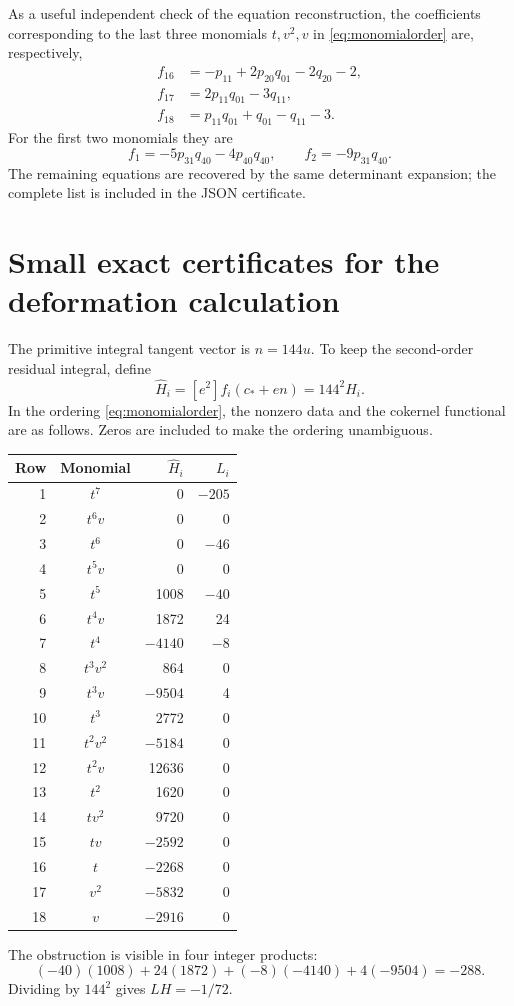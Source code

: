 \documentclass[11pt,a4paper]{article}
\numberwithin{equation}{section}
\theoremstyle{definition}
\theoremstyle{remark}
\newcommand{\cstar}{c_*}
\begin{document}
As a useful independent check of the equation reconstruction, the
coefficients corresponding to the last three monomials $t,v^2,v$ in
\eqref{eq:monomialorder} are, respectively,
\begin{align*}
f_{16}&=-p_{11}+2p_{20}q_{01}-2q_{20}-2,\\
f_{17}&=2p_{11}q_{01}-3q_{11},\\
f_{18}&=p_{11}q_{01}+q_{01}-q_{11}-3.
\end{align*}
For the first two monomials they are
\[
f_1=-5p_{31}q_{40}-4p_{40}q_{40},\qquad
f_2=-9p_{31}q_{40}.
\]
The remaining equations are recovered by the same determinant expansion;
the complete list is included in the JSON certificate.

\section{Small exact certificates for the deformation calculation}
\label{app:certificates}

The primitive integral tangent vector is $n=144u$. To keep the second-order
residual integral, define
\[
\widehat H_i=[e^2]f_i(\cstar+en)=144^2 H_i.
\]
In the ordering \eqref{eq:monomialorder}, the nonzero data and the
cokernel functional are as follows. Zeros are included to make the ordering
unambiguous.
\begin{center}
\begin{tabular}{@{}rcrr@{}}
\toprule
Row & Monomial & $\widehat H_i$ & $L_i$\\
\midrule
1 & $t^7$ & 0 & $-205$\\
2 & $t^6v$ & 0 & 0\\
3 & $t^6$ & 0 & $-46$\\
4 & $t^5v$ & 0 & 0\\
5 & $t^5$ & 1008 & $-40$\\
6 & $t^4v$ & 1872 & 24\\
7 & $t^4$ & $-4140$ & $-8$\\
8 & $t^3v^2$ & 864 & 0\\
9 & $t^3v$ & $-9504$ & 4\\
10 & $t^3$ & 2772 & 0\\
11 & $t^2v^2$ & $-5184$ & 0\\
12 & $t^2v$ & 12636 & 0\\
13 & $t^2$ & 1620 & 0\\
14 & $tv^2$ & 9720 & 0\\
15 & $tv$ & $-2592$ & 0\\
16 & $t$ & $-2268$ & 0\\
17 & $v^2$ & $-5832$ & 0\\
18 & $v$ & $-2916$ & 0\\
\bottomrule
\end{tabular}
\end{center}
The obstruction is visible in four integer products:
\[
(-40)(1008)+24(1872)+(-8)(-4140)+4(-9504)=-288.
\]
Dividing by $144^2$ gives $LH=-1/72$.
\end{document}
